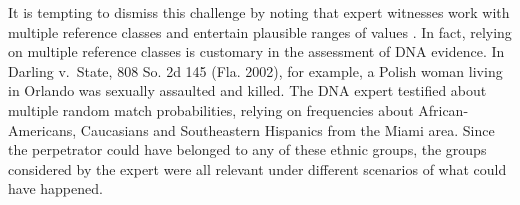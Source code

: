 \documentclass{article}
\begin{document}
It is tempting to dismiss this challenge by noting that expert witnesses work with multiple reference classes and entertain plausible ranges of values \citep{nance2007}. 
In fact, relying on multiple reference classes is customary in the assessment of DNA evidence.
 In Darling v.\ State, 808 So. 2d 145 (Fla. 2002), for example, a Polish woman living in Orlando was sexually assaulted and killed. The DNA expert testified about multiple random match probabilities, relying on frequencies about African-Americans, Caucasians and Southeastern Hispanics from the Miami area. Since the perpetrator could have belonged to any of these ethnic groups, the groups considered by the expert were all relevant under different scenarios of what could have happened. 
  
\end{document}
